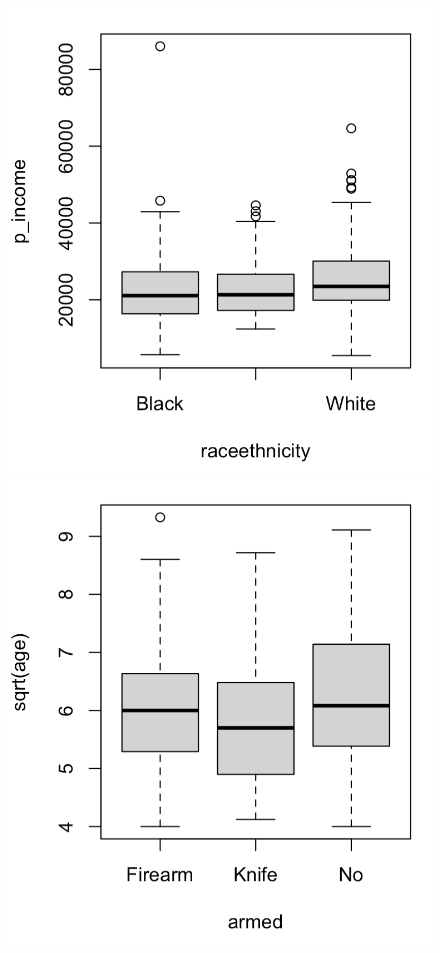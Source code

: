 \begin{figure}[h]
    \centering
    \includegraphics[scale=.35]{boxplot_pincome_race.png}
    \includegraphics[scale=.35]{boxplot_age_armed.png}

\end{figure}
